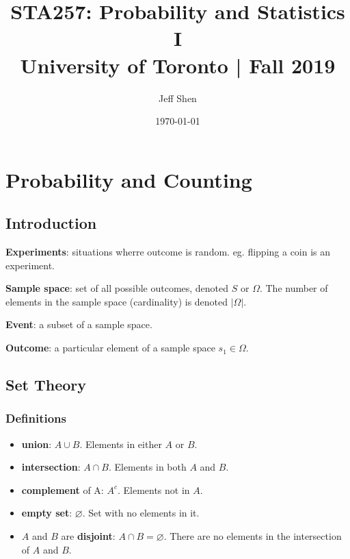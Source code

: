 \documentclass[a4paper,10pt]{article}
\begin{document}
\title{STA257: Probability and Statistics I\\
    \Large University of Toronto | Fall 2019}
\author{Jeff Shen}
\date{\today}
\maketitle
\tableofcontents



\newpage
\section{Probability and Counting}

\subsection{Introduction}

\textbf{Experiments}: situations wherre outcome is random. eg. flipping a coin is an experiment.

\textbf{Sample space}: set of all possible outcomes, denoted $S$ or $\Omega$. The number of elements in the sample space (cardinality) is denoted $|\Omega|$.

\textbf{Event}: a subset of a sample space.

\textbf{Outcome}: a particular element of a sample space $s_1 \in \Omega$.

\subsection{Set Theory}

\subsubsection{Definitions}

\begin{itemize}
    \item \textbf{union}: $A \cup B$. Elements in either $A$ or $B$.
    \item \textbf{intersection}: $A \cap B$. Elements in both $A$ and $B$. 
    \item \textbf{complement} of A: $A^c$. Elements not in $A$.
    \item \textbf{empty set}: $\varnothing$. Set with no elements in it. 
    \item $A$ and $B$ are \textbf{disjoint}: $A \cap B = \varnothing$. There are no elements in the intersection of $A$ and $B$.
\end{itemize}
\end{document}
